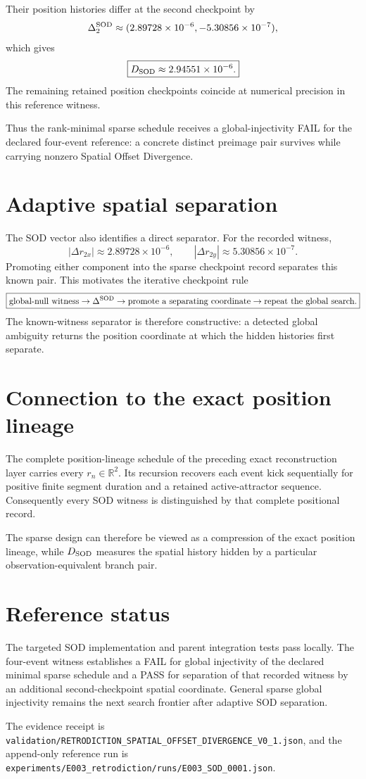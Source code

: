 Their position histories differ at the second checkpoint by
\[
\Delta_2^{\rm SOD}
\approx
(2.89728\times10^{-6},-5.30856\times10^{-7}),
\]
which gives
\[
\boxed{
D_{\rm SOD}\approx2.94551\times10^{-6}.
}
\]
The remaining retained position checkpoints coincide at numerical precision in this reference witness.

Thus the rank-minimal sparse schedule receives a global-injectivity FAIL for the declared four-event reference: a concrete distinct preimage pair survives while carrying nonzero Spatial Offset Divergence.

\section{Adaptive spatial separation}

The SOD vector also identifies a direct separator. For the recorded witness,
\[
|\Delta r_{2x}|\approx2.89728\times10^{-6},
\qquad
|\Delta r_{2y}|\approx5.30856\times10^{-7}.
\]
Promoting either component into the sparse checkpoint record separates this known pair. This motivates the iterative checkpoint rule
\[
\boxed{
\text{global-null witness}
\rightarrow
\Delta^{\rm SOD}
\rightarrow
\text{promote a separating coordinate}
\rightarrow
\text{repeat the global search}.
}
\]
The known-witness separator is therefore constructive: a detected global ambiguity returns the position coordinate at which the hidden histories first separate.

\section{Connection to the exact position lineage}

The complete position-lineage schedule of the preceding exact reconstruction layer carries every $r_n\in\mathbb R^2$. Its recursion recovers each event kick sequentially for positive finite segment duration and a retained active-attractor sequence. Consequently every SOD witness is distinguished by that complete positional record.

The sparse design can therefore be viewed as a compression of the exact position lineage, while $D_{\rm SOD}$ measures the spatial history hidden by a particular observation-equivalent branch pair.

\section{Reference status}

The targeted SOD implementation and parent integration tests pass locally. The four-event witness establishes a FAIL for global injectivity of the declared minimal sparse schedule and a PASS for separation of that recorded witness by an additional second-checkpoint spatial coordinate. General sparse global injectivity remains the next search frontier after adaptive SOD separation.

The evidence receipt is
\texttt{validation/RETRODICTION\_SPATIAL\_OFFSET\_DIVERGENCE\_V0\_1.json},
and the append-only reference run is
\texttt{experiments/E003\_retrodiction/runs/E003\_SOD\_0001.json}.
